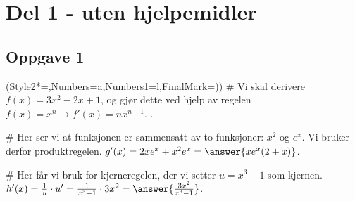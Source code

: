 


\newcommand{\fagkode}{R1}
\newcommand{\semesteraar}{høsten 2017}
\newcommand{\forfatter}{Anita G.}
\newcommand{\dokumenttittel}{Løsningsforslag -- Eksamen \fagkode, \semesteraar}

\usepackage{siunitx}


\newcommand{\logonavn}{}








\section*{Del 1 - uten hjelpemidler}
\subsection*{Oppgave 1}
\begin{easylist}[enumerate]
	\ListProperties(Style2*=,Numbers=a,Numbers1=l,FinalMark={)})
	# Vi skal derivere $f(x) =  3x^2 -2x +1$, og gjør dette ved hjelp av regelen $f(x) = x^n \rightarrow f'(x) = nx^{n-1}$. .
	
	# Her ser vi at funksjonen er sammensatt av to funksjoner: $x^2$ og $e^x$. Vi bruker derfor produktregelen. $g'(x) = 2xe^x + x^2e^x = \answer{xe^x(2+x)}$.
	
	# Her får vi bruk for kjerneregelen, der vi setter $u = x^3 -1$ som kjernen. $h'(x) = \frac{1}{u} \cdot u' = \frac{1}{x^3 -1} \cdot 3x^2 = \answer{\frac{3x^2}{x^3 -1}}$.
\end{easylist}

